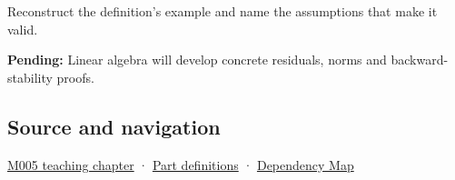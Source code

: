 Reconstruct the definition's example and name the assumptions that make it valid.

\textbf{Pending:} Linear algebra will develop concrete residuals, norms and backward-stability proofs.

\subsection{Source and navigation}\label{appendix-a7fbaf6d1b1c-source-and-navigation}

\hyperref[01-foundations-i-ch001-when-arithmetic-meets-uncertainty]{M005 teaching chapter} · \hyperref[appendix-fd090d982a15-m005---parts-77-88]{Part definitions} · \hyperref[appendix-4ad47bdd269a]{Dependency Map}
